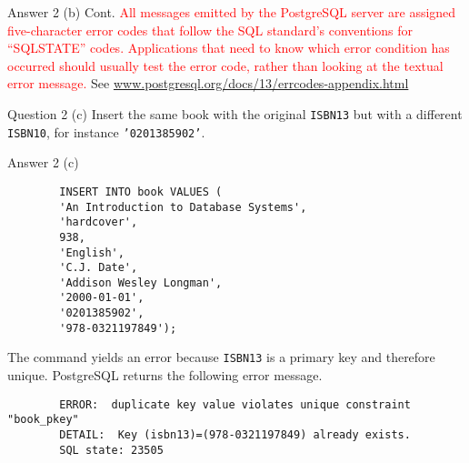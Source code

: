 \begin{frame}{Answer 2 (b) Cont.}
    \textcolor{red}{All messages emitted by the PostgreSQL server are assigned five-character error codes that follow the SQL standard's conventions for ``SQLSTATE'' codes. Applications that need to know which error condition has occurred should usually test the error code, rather than looking at the textual error message.}
		See \url{www.postgresql.org/docs/13/errcodes-appendix.html}
\end{frame}

\begin{frame}{Question 2 (c)}
Insert the same book  with the original \texttt{ISBN13} but with a different \texttt{ISBN10}, for instance \texttt{'0201385902'}.
\end{frame}


\begin{frame}{Answer 2 (c)}
\begin{lstlisting}
		INSERT INTO book VALUES (
		'An Introduction to Database Systems', 
		'hardcover',
		938,
		'English',
		'C.J. Date',
		'Addison Wesley Longman',
		'2000-01-01',
		'0201385902',
		'978-0321197849');
\end{lstlisting}
	
	The command yields an error  because  \texttt{ISBN13} is a primary key and therefore unique. PostgreSQL returns the following error message.
	
	\begin{verbatim}
		ERROR:  duplicate key value violates unique constraint "book_pkey"
		DETAIL:  Key (isbn13)=(978-0321197849) already exists.
		SQL state: 23505
	\end{verbatim}
\end{frame}


